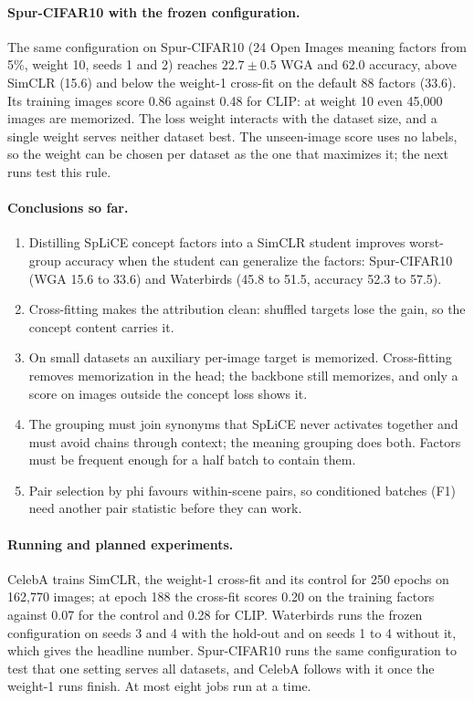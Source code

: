 \documentclass{article}
\begin{document}
\paragraph{Spur-CIFAR10 with the frozen configuration.} The same configuration on Spur-CIFAR10 (24 Open
Images meaning factors from 5\%, weight 10, seeds 1 and 2) reaches $22.7\pm0.5$ WGA and 62.0 accuracy,
above SimCLR (15.6) and below the weight-1 cross-fit on the default 88 factors (33.6). Its training
images score 0.86 against 0.48 for CLIP: at weight 10 even 45,000 images are memorized. The loss weight
interacts with the dataset size, and a single weight serves neither dataset best. The unseen-image score
uses no labels, so the weight can be chosen per dataset as the one that maximizes it; the next runs test
this rule.

\paragraph{Conclusions so far.}
\begin{enumerate}
\item Distilling SpLiCE concept factors into a SimCLR student improves worst-group accuracy when the
student can generalize the factors: Spur-CIFAR10 (WGA 15.6 to 33.6) and Waterbirds (45.8 to 51.5,
accuracy 52.3 to 57.5).
\item Cross-fitting makes the attribution clean: shuffled targets lose the gain, so the concept content
carries it.
\item On small datasets an auxiliary per-image target is memorized. Cross-fitting removes memorization in
the head; the backbone still memorizes, and only a score on images outside the concept loss shows it.
\item The grouping must join synonyms that SpLiCE never activates together and must avoid chains through
context; the meaning grouping does both. Factors must be frequent enough for a half batch to contain
them.
\item Pair selection by phi favours within-scene pairs, so conditioned batches (F1) need another pair
statistic before they can work.
\end{enumerate}

\paragraph{Running and planned experiments.}
CelebA trains SimCLR, the weight-1 cross-fit and its control for 250 epochs on 162,770 images; at epoch
188 the cross-fit scores 0.20 on the training factors against 0.07 for the control and 0.28 for CLIP.
Waterbirds runs the frozen configuration on seeds 3 and 4 with the hold-out and on seeds 1 to 4 without
it, which gives the headline number. Spur-CIFAR10 runs the same configuration to test that one setting
serves all datasets, and CelebA follows with it once the weight-1 runs finish. At most eight jobs run at
a time.
\end{document}

